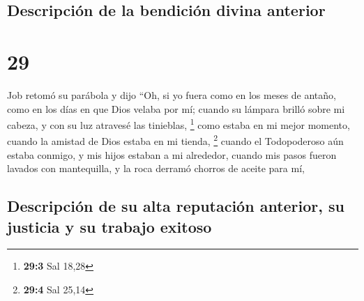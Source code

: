 \hypertarget{descripciuxf3n-de-la-bendiciuxf3n-divina-anterior}{%
\subsection{Descripción de la bendición divina
anterior}\label{descripciuxf3n-de-la-bendiciuxf3n-divina-anterior}}

\hypertarget{section-28}{%
\section{29}\label{section-28}}

 Job retomó su parábola y dijo  ``Oh, si yo
fuera como en los meses de antaño, como en los días en que Dios velaba
por mí;  cuando su lámpara brilló sobre mi cabeza, y con
su luz atravesé las tinieblas, \footnote{\textbf{29:3} Sal 18,28}
 como estaba en mi mejor momento, cuando la amistad de
Dios estaba en mi tienda, \footnote{\textbf{29:4} Sal 25,14}
 cuando el Todopoderoso aún estaba conmigo, y mis hijos
estaban a mi alrededor,  cuando mis pasos fueron lavados
con mantequilla, y la roca derramó chorros de aceite para mí,

\hypertarget{descripciuxf3n-de-su-alta-reputaciuxf3n-anterior-su-justicia-y-su-trabajo-exitoso}{%
\subsection{Descripción de su alta reputación anterior, su justicia y su
trabajo
exitoso}\label{descripciuxf3n-de-su-alta-reputaciuxf3n-anterior-su-justicia-y-su-trabajo-exitoso}}

